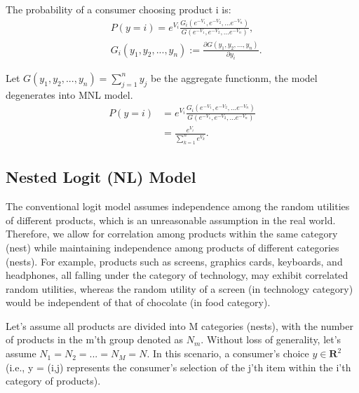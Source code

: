 \documentclass[12pt]{article}
\theoremstyle{definition}
\begin{document}
\begin{sloppypar}
The probability of a consumer choosing product i is:
\begin{align}\label{eqn:the property of GEV model}
    &P(y=i) = e^{V_{i}}\frac{G_i(e^{-V_1},e^{-V_2},...e^{-V_n})}{G(e^{-V_1},e^{-V_2},...e^{-V_n})},\\
    &G_i(y_1, y_2, ..., y_n) := \frac{\partial G(y_1, y_2, ..., y_n)}{\partial y_i}. \nonumber
\end{align}

Let $G(y_1, y_2, ..., y_n)=\sum_{j=1}^{n} y_j$ be the aggregate functionm, the model degenerates into MNL model.
\begin{align*}
    P(y=i) &= e^{V_{i}}\frac{G_i(e^{-V_1},e^{-V_2},...e^{-V_n})}{G(e^{-V_1},e^{-V_2},...e^{-V_n})}\\
    &= \frac{e^{V_{i}}}{\sum_{k=1}^{n} e^{V_{k}}}.
\end{align*}
\subsection{Nested Logit (NL) Model}
The conventional logit model assumes independence among the random utilities of different products, which is an unreasonable assumption in the real world. Therefore, we allow for correlation among products within the same category (nest) while maintaining independence among products of different categories (nests). For example, products such as screens, graphics cards, keyboards, and headphones, all falling under the category of technology, may exhibit correlated random utilities, whereas the random utility of a screen (in technology category) would be independent of that of chocolate (in food category).

Let's assume all products are divided into M categories (nests), with the number of products in the m'th group denoted as $N_m$. Without loss of generality, let's assume $N_1 = N_2 = ... = N_M = N$. In this scenario, a consumer's choice $y \in \textbf{R}^2$ (i.e., y = (i,j) represents the consumer's selection of the j'th item within the i'th category of products).


\end{sloppypar}
\end{document}

